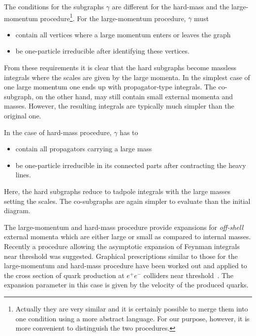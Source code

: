 The conditions for the subgraphs $\gamma$ are different for
the hard-mass and the large-momentum procedure\footnote{
  Actually they are very similar and it is certainly possible to merge
  them into one condition using a more abstract language. For our
  purpose, however, it is more convenient to distinguish the two procedures.}.
For the large-momentum procedure, $\gamma$ must
\begin{itemize}
\item contain all vertices where a large momentum enters or leaves the
  graph
\item be one-particle irreducible after identifying these
  vertices.
\end{itemize}
From these requirements it is clear that the hard subgraphs become
massless integrals where the scales are given by the large momenta. In
the simplest case of one large momentum one ends up with propagator-type
integrals.  The co-subgraph, on the other hand, may still contain small
external momenta and masses. However, the resulting integrals are
typically much simpler than the original one.

In the case of hard-mass procedure, $\gamma$ has to
\begin{itemize}
\item contain all propagators carrying a large mass
\item be one-particle irreducible in its connected parts after
  contracting the heavy lines.
\end{itemize}
Here, the hard subgraphs reduce to tadpole integrals with the large masses
setting the scales. The co-subgraphs are again simpler to
evaluate than the initial diagram.


The large-momentum and hard-mass procedure provide expansions for {\it
  off-shell} external momenta which are either large or small as
compared to internal masses. Recently a procedure allowing the
asymptotic expansion of Feynman integrals near threshold was suggested.
Graphical prescriptions similar to those for the large-momentum and
hard-mass procedure have been worked out and applied to
the cross section of quark production at $e^+e^-$ colliders near
threshold~\cite{BenSigSmi98,CzaMel98}. The expansion parameter in this case
is given by the velocity of the produced quarks.

